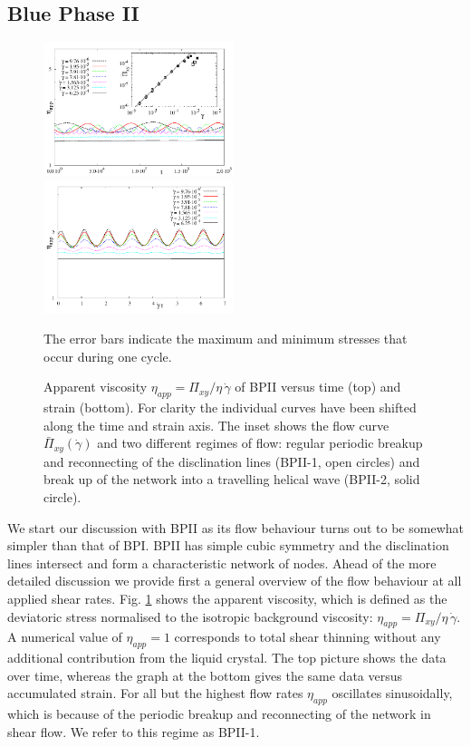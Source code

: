 \documentclass[aps,pre,reprint,superscriptaddress, twocolumn]{revtex4}
\newcommand{\gd}{\dot{\gamma}}
\begin{document}
\subsection{Blue Phase II}

\begin{figure}[htpb]
\includegraphics[width=0.495\textwidth]{stress_bp2.pdf}
\includegraphics[width=0.495\textwidth]{stress_vs_strain_bp2.pdf}
\caption{Apparent viscosity $\eta_{app}=\Pi_{xy}/\eta\,\gd$ of BPII versus time (top) and strain (bottom). 
For clarity the individual curves have been shifted along the time and strain axis. 
The inset shows the flow curve $\bar{\Pi}_{xy}(\gd)$ and two different regimes of flow: 
regular periodic breakup and reconnecting of the disclination lines (BPII-1, open circles) 
and break up of the network into a travelling helical wave (BPII-2, solid circle).}
The error bars indicate the maximum and minimum stresses that occur during one cycle.
\label{bp2-rheo}
\end{figure}

We start our discussion with BPII as its flow behaviour turns out to be somewhat simpler 
than that of BPI. BPII has simple cubic symmetry and the disclination lines intersect and form a characteristic network of nodes.
Ahead of the more detailed discussion we provide first a general overview of the flow behaviour at all applied shear rates.
Fig. \ref{bp2-rheo} shows the apparent viscosity, which is defined as the 
deviatoric stress normalised to the isotropic background viscosity: 
$\eta_{app}=\Pi_{xy}/\eta\,\gd$.
A numerical value of $\eta_{app}=1$ corresponds to total shear thinning without 
any additional contribution from the liquid crystal.
The top picture shows the data over time, whereas the graph at the bottom gives 
the same data versus accumulated strain.
For all but the highest flow rates $\eta_{app}$ oscillates sinusoidally, which
is because of the periodic breakup and reconnecting of the network in shear flow. We refer to this regime as BPII-1.
\end{document}
